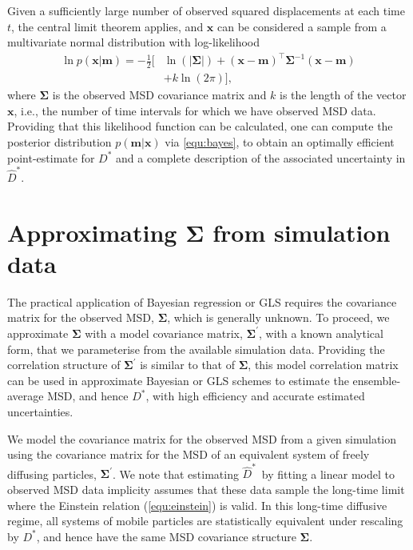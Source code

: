 \documentclass[reprint,superscriptaddress,nobibnotes,amsmath,amssymb,aps,prx,hidelinks]{revtex4-2}
\newcommand{\oMSD}{\ensuremath{\bm{x}}}
\newcommand{\model}{\bm{m}}
\newcommand{\prob}[1]{\ensuremath{p(#1)}}
\newcommand{\Dest}{\ensuremath{\widehat{D}^*}}
\newcommand{\D}{\ensuremath{D^*}}
\begin{document}
Given a sufficiently large number of observed squared displacements at each time $t$, the central limit theorem applies, and $\oMSD$ can be considered a sample from a multivariate normal distribution with log-likelihood
\begin{equation}
    \begin{aligned}{}
      \ln \prob{\oMSD|\model} = -\frac{1}{2}\big[ & \ln(\left|\mathbf{\Sigma}\right|) + {(\oMSD - \model)}^{\!\top}\mathbf{\Sigma}^{-1}(\oMSD - \model) \\ 
      & + k \ln(2\pi)\big],
    \end{aligned}
    \label{equ:loglike}
\end{equation}
where $\mathbf{\Sigma}$ is the observed MSD covariance matrix and $k$ is the length of the vector $\oMSD$, i.e., the number of time intervals for which we have observed MSD data.
Providing that this likelihood function can be calculated, one can compute the posterior distribution $\prob{\model | \oMSD}$ via \cref{equ:bayes}, to obtain an optimally efficient point-estimate for $\D$ and a complete description of the associated uncertainty in $\Dest$.

\section{Approximating $\bm{\Sigma}$ from simulation data}

The practical application of Bayesian regression or GLS requires the covariance matrix for the observed MSD, $\mathbf{\Sigma}$, which is generally unknown.
To proceed, we approximate $\mathbf{\Sigma}$ with a model covariance matrix, $\mathbf{\Sigma^\prime}$, with a known analytical form, that we parameterise from the available simulation data.
Providing the correlation structure of $\mathbf{\Sigma^\prime}$ is similar to that of $\mathbf{\Sigma}$, this model correlation matrix can be used in approximate Bayesian or GLS schemes to estimate the ensemble-average MSD, and hence $\D$, with high efficiency and accurate estimated uncertainties.

We model the covariance matrix for the observed MSD from a given simulation using the covariance matrix for the MSD of an equivalent system of freely diffusing particles, $\mathbf{\Sigma^\prime}$.
We note that estimating \Dest\ by fitting a linear model to observed MSD data implicity assumes that these data sample the long-time limit where the Einstein relation (\cref{equ:einstein}) is valid.
In this long-time diffusive regime, all systems of mobile particles are statistically equivalent under rescaling by \D, and hence have the same MSD covariance structure $\mathbf{\Sigma}$. 
\end{document}
